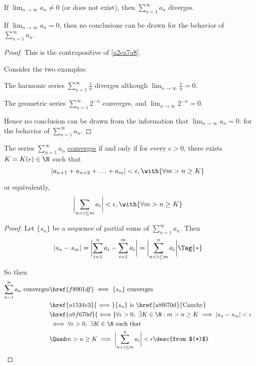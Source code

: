 \begin{enumerati}
  \item If $\displaystyle\lim_{n\to\infty}a_n\neq0$ (or does not exist), then
        $\displaystyle\sum_{n=1}^\infty a_n$ diverges.
  \item If $\displaystyle\lim_{n\to\infty}a_n=0$, then no conclusions can be
        drawn for the behavior of $\displaystyle\sum_{n=1}^\infty a_n$.
\end{enumerati}

\begin{proof}
   This is the contrapositive of \autoref{a2ca7a8}.

   Consider the two examples:
  \begin{enumerata}
    \item The harmonic series $\sum_{n=1}^\infty\frac1n$ diverges although
          $\lim_{n\to\infty}\frac1n=0$.
    \item The geometric series $\sum_{n=1}^\infty2^{-n}$ converges, and
          $\lim_{n\to\infty}2^{-n}=0$.
  \end{enumerata}

  Hence no conclusion can be drawn from the information that
  $\lim_{n\to\infty}a_n=0$. for the behavior of $\displaystyle\sum_{n=1}^\infty
  a_n$.
\end{proof}

\label{ae59546}

The series $\sum_{n=1}^\infty a_n$ \href{f8901df}{converges} if and only if for
every $\epsilon>0$, there exists $K=K(\epsilon)\in\N$ such that
$$
  |a_{n+1}+a_{n+2}+\ldots+a_m|<\epsilon,\with{\forall m>n\geq K}
$$

or equivalently,
$$
  \biggl|\sum_{n<i\leq m}a_i\biggr|<\epsilon,\with{\forall m>n\geq K}
$$

\begin{proof}
  Let $\{s_n\}$ be a sequence of partial sums of $\sum_{n=1}^\infty a_n$. Then
  \begin{align*}
    |s_n-s_m|=\biggl|\sum_{i=1}^na_i-\sum_{i=1}^ma_i\biggr|=\biggl|\sum_{n<i\leq m}^na_i\biggr|\Tag{*}
  \end{align*}

  So then
  \begin{align*}
    \sum_{n=1}^\infty a_n\text{ converges}
     &\href{f8901df}\iff\{s_n\}\text{ converges}                                                  \\
     &\href{a1534e3}{\iff}\{s_n\}\text{ is \href{a8f670d}{Cauchy}}                                \\
     &\href{a8f670d}{\iff}\forall\epsilon>0,\ \exists K\in\N:m>n\geq K\implies |s_n-s_m|<\epsilon \\
     &\iff\forall\epsilon>0,\ \exists K\in\N \text{ such that}                                    \\
     &\Quad m>n\geq K\implies\biggl|\sum_{n<i\leq m}^na_i\biggr|<\epsilon\desc{from $(*)$}
  \end{align*}
\end{proof}


